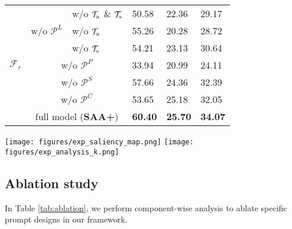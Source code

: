 \begin{figtab}
\begin{minipage}{0.48\linewidth}
{\begin{tabular}{ccllll}
\multirow{7}[10]{*}{$\mathcal{F}_r$}  & \multirow{3}{*}{w/o $\mathcal{P}^L$} & w/o $\mathcal{T}_{\rm a}$ \& $\mathcal{T}_{\rm s}$ & 50.58          & 22.36          & 29.17          \\
                     &                         & w/o $\mathcal{T}_{\rm a}$       & 55.26          & 20.28          & 28.72          \\
                     &                         & w/o $\mathcal{T}_{\rm s}$       & 54.21          & 23.13          & 30.64          \\ \cmidrule(){2-6}
                     & \multicolumn{2}{c}{w/o $\mathcal{P}^P$}             & 33.94          & 20.99          & 24.11          \\ \cmidrule(){2-6}
                     & \multicolumn{2}{c}{w/o $\mathcal{P}^S$}             & 57.66          & 24.36          & 32.39          \\ \cmidrule(){2-6}
                     & \multicolumn{2}{c}{w/o $\mathcal{P}^C$}             & 53.65          & 25.18          & 32.05          \\ \cmidrule(){2-6}
                     & \multicolumn{2}{c}{full model (\textbf{SAA+})}               & \textbf{60.40} & \textbf{25.70} & \textbf{34.07} \\ \bottomrule
\end{tabular}}\label{tab:ablation}
  \end{minipage}
  \hfill
  \begin{minipage}[t]{0.48\linewidth}
      \vspace{-50mm}
    \centering
    \texttt{[image: figures/exp\_saliency\_map.png]}
    \vspace{-6mm}
  \label{fig:influence_PS} 
  \vspace{2mm}
    \centering
    \texttt{[image: figures/exp\_analysis\_k.png]}
        \vspace{-1mm}
  \label{fig:influence_K}
  \end{minipage}%
  \vspace{-2mm}
\end{figtab}

\subsection{Ablation study}
\label{sec:ablation}
In Table \ref{tab:ablation}, we perform component-wise analysis to ablate specific prompt designs in our framework.

